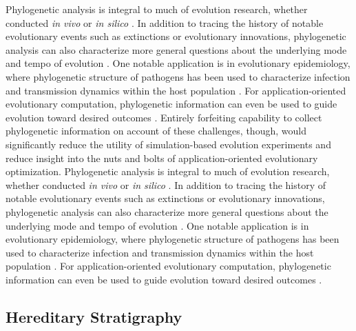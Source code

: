 Phylogenetic analysis is integral to much of evolution research, whether conducted \textit{in vivo} or \textit{in silico} \citep{faithConservationEvaluationPhylogenetic1992, STAMATAKIS2005phylogenetics,frenchHostPhylogenyShapes2023,kim2006discovery,lewinsohnStatedependentEvolutionaryModels2023a,lenski2003evolutionary}.
In addition to tracing the history of notable evolutionary events such as extinctions or evolutionary innovations, phylogenetic analysis can also characterize more general questions about the underlying mode and tempo of evolution \citep{moreno2023toward,hernandez2022can,shahbandegan2022untangling,lewinsohnStatedependentEvolutionaryModels2023a}.
One notable application is in evolutionary epidemiology, where phylogenetic structure of pathogens has been used to characterize infection and transmission dynamics within the host population \citep{giardina2017inference,voznica2022deep}.
For application-oriented evolutionary computation, phylogenetic information can even be used to guide evolution toward desired outcomes \citep{lalejini2024phylogeny,lalejini2024runtime,murphy2008simple,burke2003increased}.
Entirely forfeiting capability to collect phylogenetic information on account of these challenges, though, would significantly reduce the utility of simulation-based evolution experiments and reduce insight into the nuts and bolts of application-oriented evolutionary optimization.
Phylogenetic analysis is integral to much of evolution research, whether conducted \textit{in vivo} or \textit{in silico} \citep{faithConservationEvaluationPhylogenetic1992, STAMATAKIS2005phylogenetics,frenchHostPhylogenyShapes2023,kim2006discovery,lewinsohnStatedependentEvolutionaryModels2023a,lenski2003evolutionary}.
In addition to tracing the history of notable evolutionary events such as extinctions or evolutionary innovations, phylogenetic analysis can also characterize more general questions about the underlying mode and tempo of evolution \citep{moreno2023toward,hernandez2022can,shahbandegan2022untangling,lewinsohnStatedependentEvolutionaryModels2023a}.
One notable application is in evolutionary epidemiology, where phylogenetic structure of pathogens has been used to characterize infection and transmission dynamics within the host population \citep{giardina2017inference,voznica2022deep}.
For application-oriented evolutionary computation, phylogenetic information can even be used to guide evolution toward desired outcomes \citep{lalejini2024phylogeny,lalejini2024runtime,murphy2008simple,burke2003increased}.


\subsection{Hereditary Stratigraphy}

